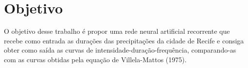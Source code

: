 \chapter{Objetivo}

O objetivo desse trabalho é propor uma rede neural artificial recorrente que recebe como entrada as durações das precipitações da cidade de Recife e consiga obter como saída as curvas de intensidade-duração-frequência, comparando-as com as curvas obtidas pela equação de Villela-Mattos (1975).
